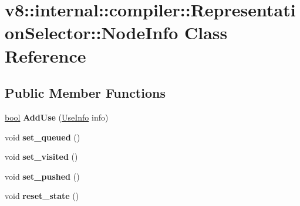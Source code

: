 \hypertarget{classv8_1_1internal_1_1compiler_1_1RepresentationSelector_1_1NodeInfo}{}\section{v8\+:\+:internal\+:\+:compiler\+:\+:Representation\+Selector\+:\+:Node\+Info Class Reference}
\label{classv8_1_1internal_1_1compiler_1_1RepresentationSelector_1_1NodeInfo}
\subsection*{Public Member Functions}
\begin{DoxyCompactItemize}
\item 
\mbox{\label{classv8_1_1internal_1_1compiler_1_1RepresentationSelector_1_1NodeInfo_a6906bb244f8616e5379d1d4395f3afab}} 
\mbox{\hyperlink{classbool}{bool}} {\bfseries Add\+Use} (\mbox{\hyperlink{classv8_1_1internal_1_1compiler_1_1UseInfo}{Use\+Info}} info)
\item 
\mbox{\label{classv8_1_1internal_1_1compiler_1_1RepresentationSelector_1_1NodeInfo_aed1a5e15ec16e398cff5769518165add}} 
void {\bfseries set\+\_\+queued} ()
\item 
\mbox{\label{classv8_1_1internal_1_1compiler_1_1RepresentationSelector_1_1NodeInfo_a31bf5b8e667f2ada7b7f0c1c3e2407f0}} 
void {\bfseries set\+\_\+visited} ()
\item 
\mbox{\label{classv8_1_1internal_1_1compiler_1_1RepresentationSelector_1_1NodeInfo_a0203c123d1c573f56a1ea25eff533047}} 
void {\bfseries set\+\_\+pushed} ()
\item 
\mbox{\label{classv8_1_1internal_1_1compiler_1_1RepresentationSelector_1_1NodeInfo_ad46493171eaf4979e3a7564feb77c2e1}} 
void {\bfseries reset\+\_\+state} ()
\item 
\mbox{\label{classv8_1_1internal_1_1compiler_1_1RepresentationSelector_1_1NodeInfo_afd4c3b051709b23ffa2d76fa4f8501be}} 

\end{DoxyCompactItemize}
